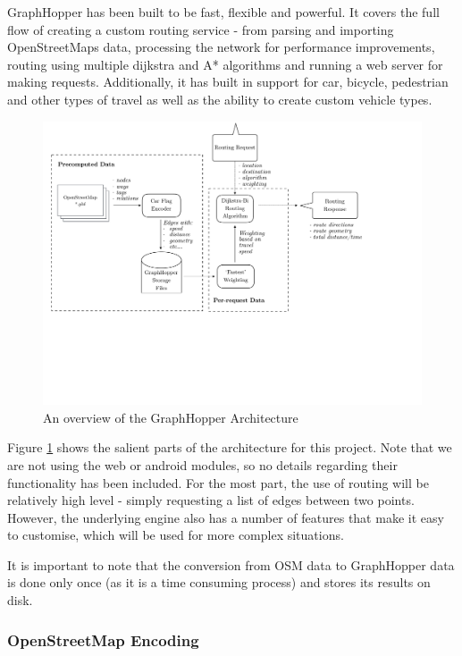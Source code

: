 \documentclass[ %
                    author={Alexander Hill},
                supervisor={Dr. Benjamin Sach},
                    degree={MEng},
                     title={MARMOSET: Multi Agent Real-time Multi-core Online
                     Simulation for Efficient Transportation},
                  subtitle={},
                      type={research},
                      year={2016} ]{dissertation}
\begin{document}
GraphHopper has been built to be fast, flexible and powerful. It covers the full
flow of creating a custom routing service - from parsing and importing
OpenStreetMaps data, processing the network for performance improvements,
routing using multiple dijkstra and A* algorithms and running a web server for
making requests. Additionally, it has built in support for car,
bicycle, pedestrian and other types of travel as well as the ability to create
custom vehicle types.

\begin{figure}[p]
    \centering
    \includegraphics[scale=0.5,page=1,clip,trim=0 8cm 4cm 0]{architecture}
    \caption{An overview of the GraphHopper Architecture}\label{fig:gh-arch}
\end{figure}

Figure \ref{fig:gh-arch} shows the salient parts of the architecture for this project.
Note that we are not using the web or android modules, so no
details regarding their functionality has been included. For the most part, the
use of routing will be relatively high level - simply requesting a list of edges
between two points. However, the underlying engine also has a number of
features that make it easy to customise, which will be used for more complex
situations.

It is important to note that the conversion from OSM data to GraphHopper data
is done only once (as it is a time consuming process) and stores its results
on disk.

\subsubsection{OpenStreetMap Encoding}
\end{document}
